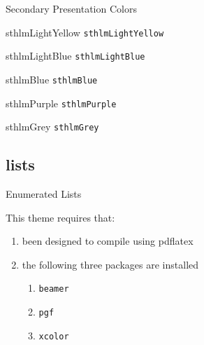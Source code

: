 \documentclass[compress]{beamer}
\begin{document}
\begin{frame}{Secondary Presentation Colors}
\begin{multicols}{2}
\begin{beamercolorbox}[wd=\linewidth,ht=2ex,dp=0.7ex]{sthlmLightYellow}
	\texttt{sthlmLightYellow}
\end{beamercolorbox}

\begin{beamercolorbox}[wd=\linewidth,ht=2ex,dp=0.7ex]{sthlmLightBlue}
	\texttt{sthlmLightBlue}
\end{beamercolorbox}

\begin{beamercolorbox}[wd=\linewidth,ht=2ex,dp=0.7ex]{sthlmBlue}
	\texttt{sthlmBlue}
\end{beamercolorbox}

\begin{beamercolorbox}[wd=\linewidth,ht=2ex,dp=0.7ex]{sthlmPurple}
	\texttt{sthlmPurple}
\end{beamercolorbox}

\begin{beamercolorbox}[wd=\linewidth,ht=2ex,dp=0.7ex]{sthlmGrey}
	\texttt{sthlmGrey}
\end{beamercolorbox}

\end{multicols}
\end{frame}

\subsection{lists}


\begin{frame}{Enumerated Lists}

This theme requires that:

\begin{enumerate}
	\item been designed to compile using pdflatex 
	\item the following three packages are installed
	\begin{enumerate}
		\item \texttt{beamer}
		\item \texttt{pgf}
		\item \texttt{xcolor}
	\end{enumerate}
\end{enumerate}


\end{frame}
\end{document}
